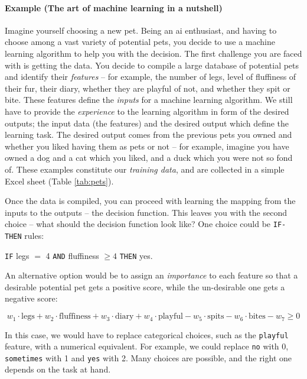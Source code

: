 \paragraph{Example (The art of machine learning in a nutshell)} Imagine yourself choosing a new pet.
Being an \gls{ai} enthusiast, and having to choose among a vast variety of potential pets, you decide to use a machine learning algorithm to help you with the decision.
The first challenge you are faced with  is getting the data.
You decide to compile a large database of potential pets and identify their \textit{features} -- for example, the number of legs, level of fluffiness of their fur, their diary, whether they are playful of not, and whether they spit or bite.
These features define the \textit{inputs} for a machine learning algorithm.
We still have to provide the \textit{experience} to the learning algorithm in form of the desired outputs; the input data (the features) and the desired output which define the learning task.
The desired output comes from the previous pets you owned and whether you liked having them as pets or not -- for example, imagine you have owned a dog and a cat which you liked, and a duck which you were not so fond of.
These examples constitute our \textit{training data}, and are collected in a simple Excel sheet (Table \ref{tab:pets}).



Once the data is compiled, you can proceed with learning the  mapping from the inputs to the outputs -- the decision function.
This leaves you with the second choice -- what should the decision function look like?
One choice could be \texttt{IF-THEN} rules:
\begin{center}
	\texttt{IF} legs $=$ 4 \texttt{AND} fluffiness $\geq 4$ \texttt{THEN} yes.
\end{center}
An alternative option would be to assign an \textit{importance} to each feature so that a desirable potential pet gets a positive score, while the un-desirable one gets a negative score:

$$ w_1 \cdot \text{legs} + w_2 \cdot \text{fluffiness} + w_3 \cdot \text{diary} + w_4 \cdot \text{playful} - w_5 \cdot \text{spits} - w_6 \cdot \text{bites} - w_7 \geq 0$$

In this case, we would have to replace categorical choices, such as the  \texttt{playful} feature, with a numerical equivalent.
For example, we could replace \texttt{no} with 0, \texttt{sometimes} with 1 and \texttt{yes} with 2.
Many choices are possible, and the right one depends on the task at hand.


